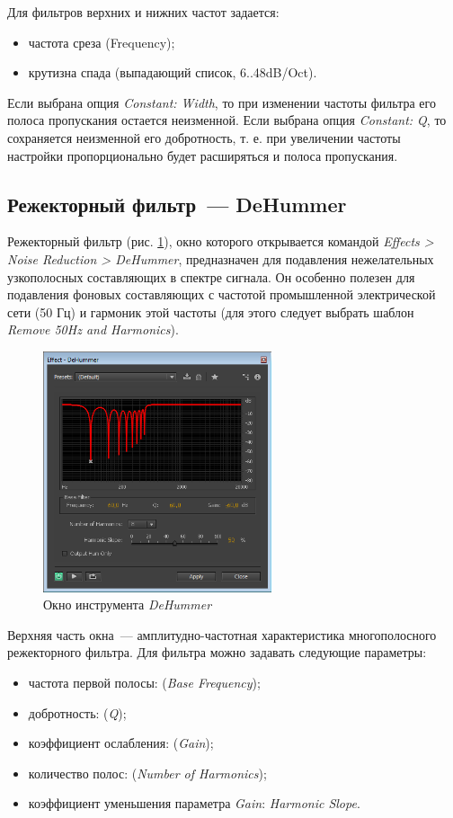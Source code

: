 \documentclass[oneside, final, 14pt]{extreport}
\begin{document}
Для фильтров верхних и нижних частот задается:
\begin{itemize}
  \item частота среза (Frequency);
  \item крутизна спада (выпадающий список, 6..48dB/Oct).
\end{itemize}

Если выбрана опция \emph{Constant: Width}, то при изменении частоты фильтра его полоса пропускания остается неизменной. Если выбрана опция \emph{Constant: Q}, то сохраняется неизменной его добротность, т. е. при увеличении частоты настройки пропорционально будет расширяться и полоса пропускания.

\subsection{Режекторный фильтр~--- DeHummer}
Режекторный фильтр (рис. \ref{pic-dehummer-01}), окно которого открывается командой \emph{Effects > Noise Reduction > DeHummer}, предназначен для подавления нежелательных узкополосных составляющих в спектре сигнала. Он особенно полезен для подавления фоновых составляющих с частотой промышленной электрической сети (50 Гц) и гармоник этой частоты (для этого следует выбрать шаблон \emph{Remove 50Hz and Harmonics}).

\begin{figure}[h!]
  \centering
  \includegraphics[width=0.6\textwidth]{pic-dehummer-01}
  \caption{Окно инструмента \emph{DeHummer}}
  \label{pic-dehummer-01}
\end{figure}

Верхняя часть окна~--- амплитудно-частотная характеристика многополосного режекторного фильтра. Для фильтра можно задавать следующие параметры:
\begin{itemize}
  \item частота первой полосы: (\emph{Base Frequency});
  \item добротность: (\emph{Q});
  \item коэффициент ослабления: (\emph{Gain});
  \item количество полос: (\emph{Number of Harmonics});
  \item коэффициент уменьшения параметра \emph{Gain}: \emph{Harmonic Slope}.
\end{itemize}
\end{document}
